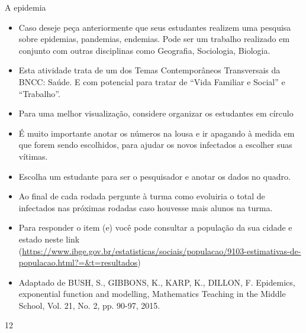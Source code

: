 \begin{sugestions}{A epidemia}
{
	\begin{itemize}
	\item Caso deseje peça anteriormente que seus estudantes realizem uma pesquisa sobre epidemias, pandemias, endemias. Pode ser um trabalho realizado em conjunto com outras disciplinas como Geografia, Sociologia, Biologia.
	\item Esta atividade trata de um dos Temas Contemporâneos Transversais da BNCC: Saúde. E com potencial para tratar de “Vida Familiar e Social” e “Trabalho”.
	\item Para uma melhor visualização, considere organizar os estudantes em círculo
	\item É muito importante anotar os números na lousa e ir apagando à medida em que forem sendo escolhidos, para ajudar os novos infectados a escolher suas vítimas.
	\item Escolha um estudante para ser o pesquisador e anotar os dados no quadro.
	\item Ao final de cada rodada pergunte à turma como evoluiria o total de infectados nas próximas rodadas caso houvesse mais alunos na turma.
	\item Para responder o item (e) você pode consultar a população da sua cidade e estado neste link (\url{https://www.ibge.gov.br/estatisticas/sociais/populacao/9103-estimativas-de-populacao.html?=&t=resultados})
	\item Adaptado de BUSH, S., GIBBONS, K., KARP, K., DILLON, F. Epidemics, exponential function and modelling, Mathematics Teaching in the Middle School, Vol. 21, No. 2, pp. 90-97, 2015.
	\end{itemize}
}{1}{2}
\end{sugestions}
